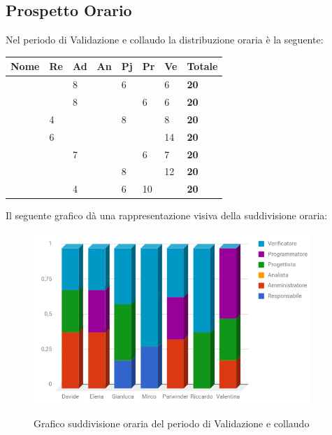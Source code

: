 \documentclass[PianoDiProgetto.tex]{subfiles}
\begin{document}
\subsection{Prospetto Orario}
Nel periodo di Validazione e collaudo la distribuzione oraria è la seguente:
\begin{center}
	\begin{table}[htbp]
		\centering
		\renewcommand\arraystretch{1.5}
		\begin{tabularx}{\textwidth}{p{4cm}|p{1cm}|p{1cm}|p{1cm}|p{1cm}|p{1cm}|p{1cm}|p{2cm}}
			\hline
			\textbf{Nome} & \textbf{Re} & \textbf{Ad} & \textbf{An} & \textbf{Pj} & \textbf{Pr} & \textbf{Ve} & \textbf{Totale} \\
			\hline
			\Davide & \ & 8 & \ & 6 & \ & 6 & \textbf{20} \\
			\hline
			\Elena & \ & 8 & \ & \ & 6 & 6 & \textbf{20} \\
			\hline
			\Gianluca & 4 & \ & \ & 8 & \ & 8 & \textbf{20} \\
			\hline
			\Mirco & 6 & \ & \ & \ & \ & 14 & \textbf{20} \\
			\hline
			\Parwinder & \ & 7 & \ & \ & 6 & 7 & \textbf{20} \\
			\hline
			\Riccardo & \ & \ & \ & 8 & \ & 12 & \textbf{20} \\
			\hline
			\Valentina & \ & 4 & \ & 6 & 10 & \ & \textbf{20} \\
			\hline
		\end{tabularx}
	\end{table} 	
\end{center}
Il seguente grafico dà una rappresentazione visiva della suddivisione oraria:
\begin{figure}[h]
	\includegraphics[width=10.5cm]{images/prospettoOrario/valCol.png}
	\label{fig:foo}
	\caption{Grafico suddivisione oraria del periodo di Validazione e collaudo}
\end{figure} 
\newpage
\end{document}

